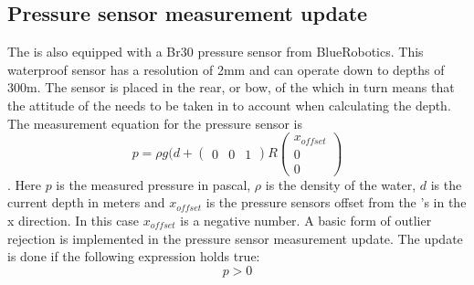 \subsection{Pressure sensor measurement update}
The \abbrROV is also equipped with a Br30 pressure sensor from BlueRobotics. This waterproof sensor has a resolution of 2mm and can operate down to depths of 300m. The sensor is placed in the rear, or bow, of the \abbrROV which in turn means that the attitude of the \abbrROV needs to be taken in to account when calculating the depth.
The measurement equation for the pressure sensor is
\begin{equation}
p =  \rho g (d + \begin{pmatrix}
    0 & 0 & 1
\end{pmatrix} R 
\begin{pmatrix}
x_{offset}\\
0\\
0
\end{pmatrix}
\end{equation}.
Here $p$ is the measured pressure in pascal, $\rho$ is the density of the water, $d$ is the current depth in meters and $x_{offset}$ is the pressure sensors offset from the \abbrROV's \abbrCO in the x direction. In this case $x_{offset}$ is a negative number.
A basic form of outlier rejection is implemented in the pressure sensor measurement update. The update is done if the following expression holds true:
\begin{equation}
    p > 0
\end{equation}